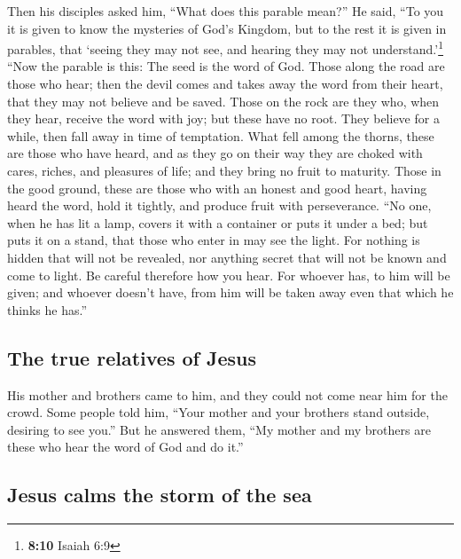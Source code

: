  Then his disciples asked him, ``What does this parable
mean?''  He said, ``To you it is given to know the
mysteries of God's Kingdom, but to the rest it is given in parables,
that `seeing they may not see, and hearing they may not
understand.'\footnote{\textbf{8:10} Isaiah 6:9}  ``Now
the parable is this: The seed is the word of God.  Those
along the road are those who hear; then the devil comes and takes away
the word from their heart, that they may not believe and be saved.
 Those on the rock are they who, when they hear, receive
the word with joy; but these have no root. They believe for a while,
then fall away in time of temptation.  What fell among
the thorns, these are those who have heard, and as they go on their way
they are choked with cares, riches, and pleasures of life; and they
bring no fruit to maturity.  Those in the good ground,
these are those who with an honest and good heart, having heard the
word, hold it tightly, and produce fruit with perseverance.
 ``No one, when he has lit a lamp, covers it with a
container or puts it under a bed; but puts it on a stand, that those who
enter in may see the light.  For nothing is hidden that
will not be revealed, nor anything secret that will not be known and
come to light.  Be careful therefore how you hear. For
whoever has, to him will be given; and whoever doesn't have, from him
will be taken away even that which he thinks he has.''

\hypertarget{the-true-relatives-of-jesus}{%
\subsection{The true relatives of
Jesus}\label{the-true-relatives-of-jesus}}

 His mother and brothers came to him, and they could not
come near him for the crowd.  Some people told him,
``Your mother and your brothers stand outside, desiring to see you.''
 But he answered them, ``My mother and my brothers are
these who hear the word of God and do it.''

\hypertarget{jesus-calms-the-storm-of-the-sea}{%
\subsection{Jesus calms the storm of the
sea}\label{jesus-calms-the-storm-of-the-sea}}

